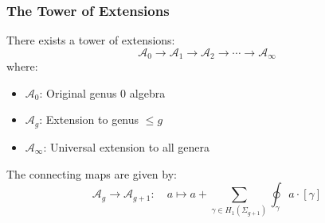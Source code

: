 \subsubsection{The Tower of Extensions}

\begin{theorem}
There exists a tower of extensions:
\[
\mathcal{A}_0 \to \mathcal{A}_1 \to \mathcal{A}_2 \to \cdots \to \mathcal{A}_\infty
\]
where:
\begin{itemize}
\item $\mathcal{A}_0$: Original genus 0 algebra
\item $\mathcal{A}_g$: Extension to genus $\leq g$
\item $\mathcal{A}_\infty$: Universal extension to all genera
\end{itemize}

The connecting maps are given by:
\[
\mathcal{A}_g \to \mathcal{A}_{g+1}: \quad a \mapsto a + \sum_{\gamma \in H_1(\Sigma_{g+1})} \oint_\gamma a \cdot [\gamma]
\]
\end{theorem}
